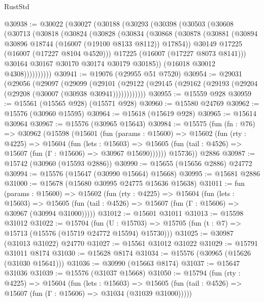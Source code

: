 \begin{lexlean}{RustStd}
\begin{coremodule}
@30938 := @30022
    (@30027
      (@30188
        (@30293
          (@30398
            (@30503
              (@30608
                (@30713
                  (@30818
                    (@30824
                      (@30828
                        (@30834
                          (@30868
                            (@30878
                              (@30881 (@30894 @30896 @18744 (@16007 (@19100 @8133 @8112)) @17854))
                              @30149
                              @17225
                              (@16007 (@17227 @8104 @4520)))
                            @17225
                            (@16007 (@17227 @8073 @8141)))
                          @30164
                          @30167
                          @30170
                          @30174
                          @30179
                          @30185))
                      (@16018 @30012 @4308))))))))))
@30941 := @19076 (@29955 @51 @7520)
@30954 := @29031
    (@29056
      (@29097
        (@29099
          (@29101 (@29122 (@29145 (@29162 (@29193 (@29204 (@29208 (@30007 (@30938 @30941))))))))))))
@30955 := @15559 @928
@30959 := @15561 (@15565 @928) (@15571 @928)
@30960 := @15580 @24769
@30962 := @15576 (@30960 @15595)
@30964 := @15618 (@15619 @928)
@30965 := @15614 @30964
@30967 := @15576 (@30965 @15643)
@30984 := @15575
    (fun (fn : @76) =>
    @30962
      (@15598
        (@15601
          (fun (params : @15600) =>
          @15602
            (fun (rty : @4225) =>
            @15604
              (fun (lets : @15603) =>
              @15605 (fun (tail : @4526) => @15607 (fun (Γ : @15606) => @30967 @15690))))))
        @15736))
    @2886
@30987 := @15742 (@30960 (@15593 @2886))
@30990 := @15655 (@15656 @2886) @24772
@30994 := @15576 (@15647 (@30990 @15664) @15668)
@30995 := @15681 @2886
@31000 := @15678 (@15680 @30995 @24775 @15636 @15638)
@31011 := fun (params : @15600) =>
  @15602
    (fun (rty : @4225) =>
    @15604
      (fun (lets : @15603) =>
      @15605 (fun (tail : @4526) => @15607 (fun (Γ : @15606) => @30967 (@30994 @31000)))))
@31012 := @15601 @31011
@31013 := @15598 @31012
@31022 := @15704
    (fun (U : @15703) => @15705 (fun (t : @7) => @15713 (@15576 (@15719 @24772 @15594) @15730)))
@31025 := @30987 (@31013 @31022) @24770
@31027 := @15561 @31012 @31022
@31029 := @15791 @31011 @8174
@31030 := @15628 @8174
@31034 := @15576 (@30965 (@15626 (@31030 @15641)))
@31036 := @30990 (@15663 @8174)
@31037 := @15647 @31036
@31039 := @15576 (@31037 @15668)
@31050 := @15794
    (fun (rty : @4225) =>
    @15604
      (fun (lets : @15603) =>
      @15605 (fun (tail : @4526) => @15607 (fun (Γ : @15606) => @31034 (@31039 @31000)))))

\end{coremodule}
\end{lexlean}
